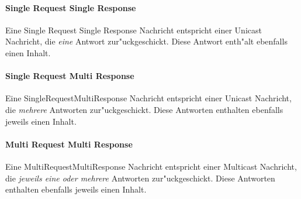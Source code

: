 \paragraph{Single Request Single Response}
Eine Single Request Single Response Nachricht entspricht einer Unicast Nachricht, die {\it eine} Antwort zur"uckgeschickt. Diese Antwort enth"alt ebenfalls einen Inhalt.
\paragraph{Single Request Multi Response}
Eine SingleRequestMultiResponse Nachricht entspricht einer Unicast Nachricht, die {\it mehrere} Antworten zur"uckgeschickt. Diese Antworten enthalten ebenfalls jeweils einen Inhalt.
\paragraph{Multi Request Multi Response}
Eine MultiRequestMultiResponse Nachricht entspricht einer Multicast Nachricht, die {\it jeweils eine oder mehrere} Antworten zur"uckgeschickt. Diese Antworten enthalten ebenfalls jeweils einen Inhalt.

\clearpage

